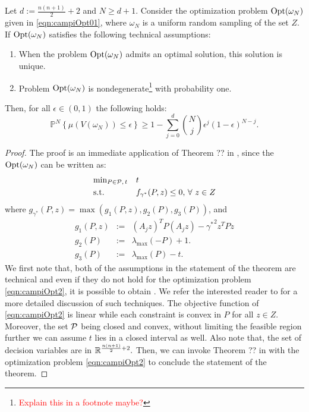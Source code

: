 \begin{theorem}\label{mainTheorem0}
Let $d:=\frac{n(n+1)}{2}+2$ and $N \geq d+1$. Consider the optimization problem $\text{Opt}(\omega_N)$ given in \eqref{eqn:campiOpt01}, where $\omega_N$ is a uniform random sampling of the set $Z$. If $\text{Opt}(\omega_N)$ satisfies the following technical assumptions:
\begin{enumerate}
\item When the problem $\text{Opt}(\omega_N)$ admits an optimal solution, this solution is unique.
\item Problem $\text{Opt}(\omega_N)$ is nondegenerate\footnote{\textcolor{red}{Explain this in a footnote maybe?}} with probability one.
\end{enumerate}
Then, for all $\epsilon \in (0,1)$ the following holds:
\begin{equation}\label{eqn:violation}\mathbb{P}^N\left\{ \mu(V(\omega_N)) \leq \epsilon \right\} \geq 1- \sum_{j=0}^{d} \binom{N}{j}\epsilon^j (1-\epsilon)^{N-j}.\end{equation}
\end{theorem}

\begin{proof}The proof is an immediate application of Theorem ?? in \cite{campi}, since the $\text{Opt}(\omega_N)$
can be written as:
\begin{equation}
\label{eqn:campiOpt2}
\begin{aligned}
& \text{min}_{P \in \mathcal{P},\, t} & & t \\
& \text{s.t.} 
& & f_{\gamma^*}(P, z) \leq 0,\,\forall\ z \in Z\end{aligned}
\end{equation}
where $g_{\gamma^*}(P,z) = \max(g_1(P, z), g_2(P), g_3(P))$, and 
\begin{eqnarray*}
g_1(P, z) &:=& (A_j z)^TP(A_j z) - {\gamma^*}^2 z^TPz \\
g_2(P) &:=& \lambda_{\max}(-P) +1. \\
g_3(P) &:=&  \lambda_{\max}(P) - t.
\end{eqnarray*}
We first note that, both of the assumptions in the statement of the theorem are technical and even if they do not hold for the optimization problem \ref{eqn:campiOpt2}, it is possible to obtain . We refer the interested reader to \cite{campi} for a more detailed discussion of such techniques. The objective function of \eqref{eqn:campiOpt2} is linear while each constraint is convex in $P$ for all $z \in Z$. Moreover, the set $\mathcal{P}$ being closed and convex, without limiting the feasible region further we can assume $t$ lies in a closed interval as well. Also note that, the set of decision variables are in $\mathbb{R}^{\frac{n(n+1)}{2}+2}.$  Then, we can invoke Theorem ?? in \cite{campi} with the optimization problem \eqref{eqn:campiOpt2} to conclude the statement of the theorem.
\end{proof}

